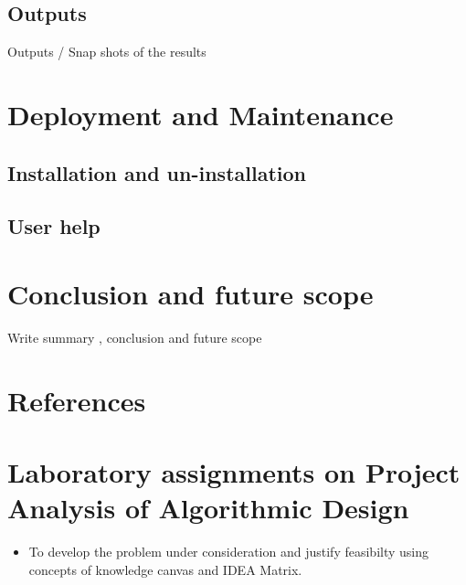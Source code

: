 \documentclass[oneside,a4paper,12pt]{report}
\begin{document}
\begin{normalsize}
\section{Outputs}

    Outputs / Snap shots of the results
\chapter{Deployment and Maintenance}
     \section{Installation and un-installation}
     \section{User help}
     
 \chapter{Conclusion and future scope}
Write  summary , conclusion and future scope
 {}

\begin{appendices}

\chapter{References}



\chapter{Laboratory assignments on Project Analysis of Algorithmic Design}
\begin{itemize}
\item To develop the problem under consideration and justify feasibilty using
concepts of knowledge canvas and IDEA Matrix.\\


\end{itemize}
\end{appendices}
\end{normalsize}
\end{document}
